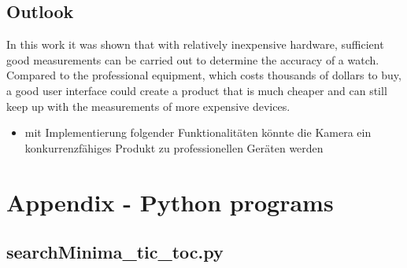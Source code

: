 \documentclass[12pt, a4paper]{report}
\begin{document}
    \section{Outlook}
    In this work it was shown that with relatively inexpensive hardware, sufficient good measurements can be carried out to determine the accuracy of a watch. Compared to the professional equipment, which costs thousands of dollars to buy, a good user interface could create a product that is much cheaper and can still keep up with the measurements of more expensive devices. 
    
             \begin{itemize}
    \item mit Implementierung folgender Funktionalitäten könnte die Kamera ein konkurrenzfähiges Produkt zu professionellen Geräten werden
    \end{itemize}
    
    \glsaddall
    \printglossaries

\printbibliography
        
    \listoffigures
    \bigskip
      
     \chapter*{Appendix - Python programs}  
     \section*{searchMinima\_tic\_toc.py}  
    
    
    
\end{document}
